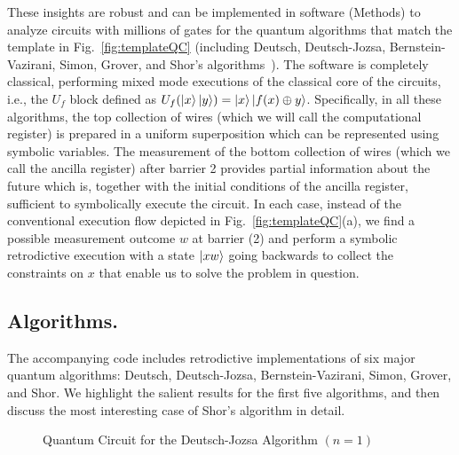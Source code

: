 \documentclass[sigplan]{acmart}
\begin{document}
These insights are robust and can be implemented in software (Methods)
to analyze circuits with millions of gates for the quantum algorithms
that match the template in Fig.~\ref{fig:templateQC} (including
Deutsch, Deutsch-Jozsa, Bernstein-Vazirani, Simon, Grover, and Shor's
algorithms~\cite{doi:10.1137/S0097539796300921,deutsch,deutschJozsa,365701,doi:10.1137/S0097539795293172,nielsen_chuang_2010,10.1145/237814.237866}). The
software is completely classical, performing mixed mode executions of
the classical core of the circuits, i.e., the $U_f$ block defined as
$U_f(\ket{x}\ket{y}) = \ket{x}\ket{f(x) \oplus y}$. Specifically, in
all these algorithms, the top collection of wires (which we will call
the computational register) is prepared in a uniform superposition
which can be represented using symbolic variables. The measurement of
the bottom collection of wires (which we call the ancilla register)
after barrier 2 provides partial information about the future which
is, together with the initial conditions of the ancilla register,
sufficient to symbolically execute the circuit. In each case, instead
of the conventional execution flow depicted in
Fig.~\ref{fig:templateQC}(a), we find a possible measurement outcome
$w$ at barrier (2) and perform a symbolic retrodictive execution with
a state $\ket{xw}$ going backwards to collect the constraints on $x$
that enable us to solve the problem in question.

\subsection*{Algorithms.} 

The accompanying code includes retrodictive implementations of six
major quantum algorithms: Deutsch, Deutsch-Jozsa, Bernstein-Vazirani,
Simon, Grover, and Shor. We highlight the salient results for the
first five algorithms, and then discuss the most interesting case of
Shor's algorithm in detail.

\begin{wrapfigure}{r}{6cm}
  \centering
{}
\caption{\label{fig:deutsch}Quantum Circuit for the Deutsch-Jozsa
  Algorithm $(n=1)$}
\end{wrapfigure}
\end{document}
